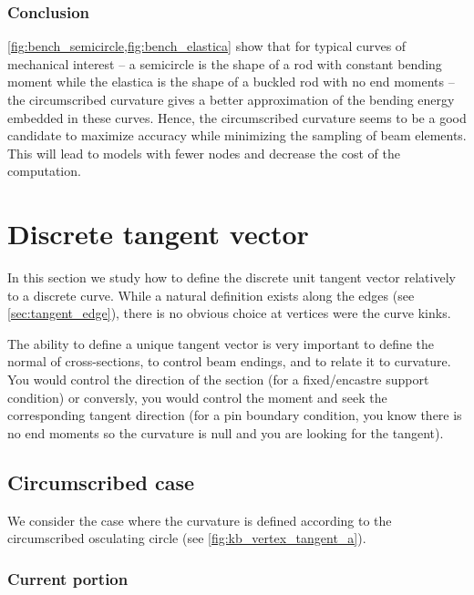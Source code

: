 \subsubsection{Conclusion}
\cref{fig:bench_semicircle,fig:bench_elastica} show that for typical curves of mechanical interest -- a semicircle is the shape of a rod with constant bending moment while the elastica is the shape of a buckled rod with no end moments -- the circumscribed curvature gives a better approximation of the bending energy embedded in these curves. Hence, the circumscribed curvature seems to be a good candidate to maximize accuracy while minimizing the sampling of beam elements. This will lead to models with fewer nodes and decrease the cost of the computation.

\section{Discrete tangent vector}\label{sec:discrete_tangent}

In this section we study how to define the discrete unit tangent vector relatively to a discrete curve. While a natural definition exists along the edges (see \cref{sec:tangent_edge}), there is no obvious choice at vertices were the curve kinks.

The ability to define a unique tangent vector is very important to define the normal of cross-sections, to control beam endings, and to relate it to curvature.
You would control the direction of the section (for a fixed/encastre support condition) or conversly, you would control the moment and seek the corresponding tangent direction (for a pin boundary condition, you know there is no end moments so the curvature is null and you are looking for the tangent).

\subsection{Circumscribed case}\label{sec:discrete_tangent_circumscribed}

We consider the case where the curvature is defined according to the circumscribed osculating circle (see \cref{fig:kb_vertex_tangent_a}). 

\subsubsection{Current portion}


